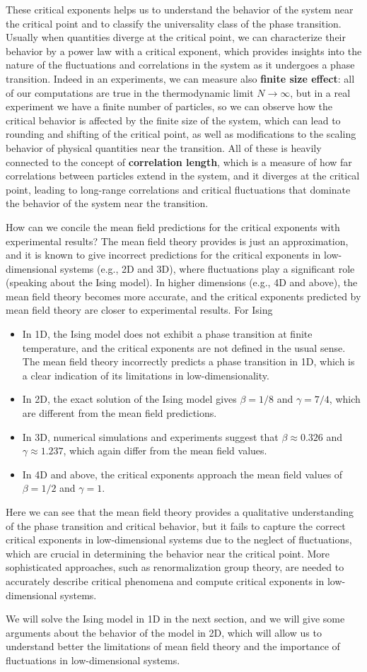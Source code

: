 These critical exponents helps us to understand the behavior of the system near the critical point and to classify the universality class of the phase transition. Usually when quantities diverge at the critical point, we can characterize their behavior by a power law with a critical exponent, which provides insights into the nature of the fluctuations and correlations in the system as it undergoes a phase transition. Indeed in an experiments, we can measure also \textbf{finite size effect}: all of our computations are true in the thermodynamic limit \(N \to \infty\), but in a real experiment we have a finite number of particles, so we can observe how the critical behavior is affected by the finite size of the system, which can lead to rounding and shifting of the critical point, as well as modifications to the scaling behavior of physical quantities near the transition. All of these is heavily connected to the concept of \textbf{correlation length}, which is a measure of how far correlations between particles extend in the system, and it diverges at the critical point, leading to long-range correlations and critical fluctuations that dominate the behavior of the system near the transition.

How can we concile the mean field predictions for the critical exponents with experimental results? The mean field theory provides is just an approximation, and it is known to give incorrect predictions for the critical exponents in low-dimensional systems (e.g., 2D and 3D), where fluctuations play a significant role (speaking about the Ising model). In higher dimensions (e.g., 4D and above), the mean field theory becomes more accurate, and the critical exponents predicted by mean field theory are closer to experimental results. For Ising
\begin{itemize}
    \item In 1D, the Ising model does not exhibit a phase transition at finite temperature, and the critical exponents are not defined in the usual sense. The mean field theory incorrectly predicts a phase transition in 1D, which is a clear indication of its limitations in low-dimensionality.
    \item In 2D, the exact solution of the Ising model gives \(\beta = 1/8\) and \(\gamma = 7/4\), which are different from the mean field predictions.
    \item In 3D, numerical simulations and experiments suggest that \(\beta \approx 0.326\) and \(\gamma \approx 1.237\), which again differ from the mean field values.
    \item In 4D and above, the critical exponents approach the mean field values of \(\beta = 1/2\) and \(\gamma = 1\).
\end{itemize}
Here we can see that the mean field theory provides a qualitative understanding of the phase transition and critical behavior, but it fails to capture the correct critical exponents in low-dimensional systems due to the neglect of fluctuations, which are crucial in determining the behavior near the critical point. More sophisticated approaches, such as renormalization group theory, are needed to accurately describe critical phenomena and compute critical exponents in low-dimensional systems.

We will solve the Ising model in 1D in the next section, and we will give some arguments about the behavior of the model in 2D, which will allow us to understand better the limitations of mean field theory and the importance of fluctuations in low-dimensional systems.
